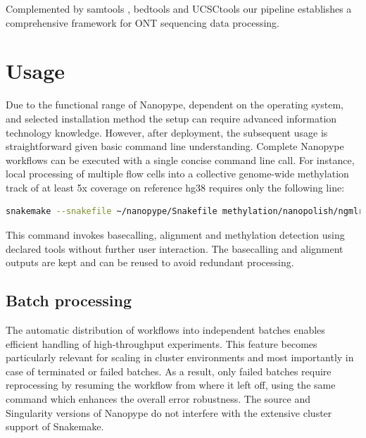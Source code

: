 Complemented by samtools \cite{Li2009}, bedtools \cite{Quinlan2010} and UCSCtools \cite{Kent2010} our pipeline establishes a comprehensive framework for ONT sequencing data processing.




\section{Usage}
\label{sec:nanopype:usage}
Due to the functional range of Nanopype, dependent on the operating system, and selected installation method the setup can require advanced information technology knowledge. However, after deployment, the subsequent usage is straightforward given basic command line understanding. Complete Nanopype workflows can be executed with a single concise command line call. For instance, local processing of multiple flow cells into a collective genome-wide methylation track of at least 5x coverage on reference hg38 requires only the following line:

\begin{lstlisting}[language=sh, caption=Snakemake example]
snakemake --snakefile ~/nanopype/Snakefile methylation/nanopolish/ngmlr/guppy/Hues8.5x.hg38.bw
\end{lstlisting}

This command invokes basecalling, alignment and methylation detection using declared tools without further user interaction. The basecalling and alignment outputs are kept and can be reused to avoid redundant processing.



\subsection{Batch processing}
The automatic distribution of workflows into independent batches enables efficient handling of high-throughput experiments. This feature becomes particularly relevant for scaling in cluster environments and most importantly in case of terminated or failed batches. As a result, only failed batches require reprocessing by resuming the workflow from where it left off, using the same command which enhances the overall error robustness.
The source and Singularity versions of Nanopype do not interfere with the extensive cluster support of Snakemake.

